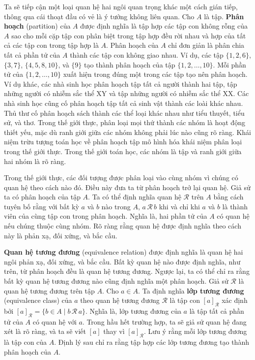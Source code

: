 Ta sẽ tiếp cận một loại quan hệ hai ngôi quan trọng khác một cách gián tiếp, thông qua cái thoạt đầu có vẻ là ý tưởng không liên quan. Cho $A$ là tập. \textbf{Phân hoạch} (partition) của $A$ được định nghĩa là tập hợp các tập con không rỗng của $A$ sao cho mỗi cặp tập con phân biệt trong tập hợp đều rời nhau và hợp của tất cả các tập con trong tập hợp là $A$. Phân hoạch của $A$ chỉ đơn giản là phân chia tất cả phần tử của $A$ thành các tập con không giao nhau. Ví dụ, các tập $\{1,2,6\}$, $\{3,7\}$, $\{4,5,8,10\}$, và $\{9\}$ tạo thành phân hoạch của tập $\{1,2,\ldots,10\}$. Mỗi phần tử của $\{1,2,\ldots,10\}$ xuất hiện trong đúng một trong các tập tạo nên phân hoạch. Ví dụ khác, các nhà sinh học phân hoạch tập tất cả người thành hai tập, tập những người có nhiễm sắc thể XY và tập những người có nhiễm sắc thể XX. Các nhà sinh học cũng cố phân hoạch tập tất cả sinh vật thành các loài khác nhau. Thủ thư cố phân hoạch sách thành các thể loại khác nhau như tiểu thuyết, tiểu sử, và thơ. Trong thế giới thực, phân loại mọi thứ thành các nhóm là hoạt động thiết yếu, mặc dù ranh giới giữa các nhóm không phải lúc nào cũng rõ ràng. Khái niệm trừu tượng toán học về phân hoạch tập mô hình hóa khái niệm phân loại trong thế giới thực. Trong thế giới toán học, các nhóm là tập và ranh giới giữa hai nhóm là rõ ràng.

Trong thế giới thực, các đối tượng được phân loại vào cùng nhóm vì chúng có quan hệ theo cách nào đó. Điều này đưa ta từ phân hoạch trở lại quan hệ. Giả sử ta có phân hoạch của tập $A$. Ta có thể định nghĩa quan hệ $\mathcal{R}$ trên $A$ bằng cách tuyên bố rằng với bất kỳ $a$ và $b$ nào trong $A$, $a\,\mathcal{R}\,b$ khi và chỉ khi $a$ và $b$ là thành viên của cùng tập con trong phân hoạch. Nghĩa là, hai phần tử của $A$ có quan hệ nếu chúng thuộc cùng nhóm. Rõ ràng rằng quan hệ được định nghĩa theo cách này là phản xạ, đối xứng, và bắc cầu.

\textbf{Quan hệ tương đương} (equivalence relation) được định nghĩa là quan hệ hai ngôi phản xạ, đối xứng, và bắc cầu. Bất kỳ quan hệ nào được định nghĩa, như trên, từ phân hoạch đều là quan hệ tương đương. Ngược lại, ta có thể chỉ ra rằng bất kỳ quan hệ tương đương nào cũng định nghĩa một phân hoạch. Giả sử $\mathcal{R}$ là quan hệ tương đương trên tập $A$. Cho $a \in A$. Ta định nghĩa \textbf{lớp tương đương} (equivalence class) của $a$ theo quan hệ tương đương $\mathcal{R}$ là tập con $[a]_{\mathcal{R}}$ xác định bởi $[a]_{\mathcal{R}} = \{b \in A \mid b\,\mathcal{R}\,a\}$. Nghĩa là, lớp tương đương của $a$ là tập tất cả phần tử của $A$ có quan hệ với $a$. Trong hầu hết trường hợp, ta sẽ giả sử quan hệ đang xét là rõ ràng, và ta sẽ viết $[a]$ thay vì $[a]_{\mathcal{R}}$. Lưu ý rằng mỗi lớp tương đương là tập con của $A$. Định lý sau chỉ ra rằng tập hợp các lớp tương đương tạo thành phân hoạch của $A$.

